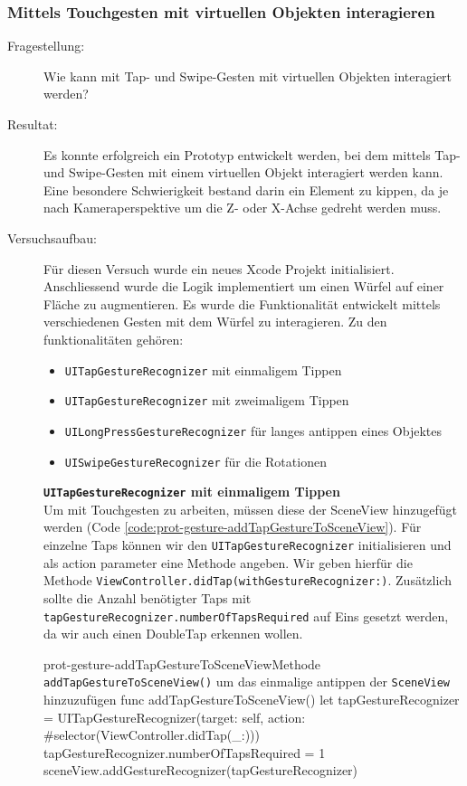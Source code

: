 \subsubsection{Mittels Touchgesten mit virtuellen Objekten interagieren}\label{subsub:prot-interagieren}
\begin{description}
	\item[Fragestellung:] Wie kann mit Tap- und Swipe-Gesten mit virtuellen Objekten interagiert werden?
	\item[Resultat:] Es konnte erfolgreich ein Prototyp entwickelt werden, bei dem mittels Tap- und Swipe-Gesten mit einem virtuellen Objekt interagiert werden kann. Eine besondere Schwierigkeit bestand darin ein Element zu kippen, da je nach Kameraperspektive um die Z- oder X-Achse gedreht werden muss. 
    \item[Versuchsaufbau:] Für diesen Versuch wurde ein neues Xcode Projekt initialisiert. Anschliessend wurde die Logik implementiert um einen Würfel auf einer Fläche zu augmentieren. Es wurde die Funktionalität entwickelt mittels verschiedenen Gesten mit dem Würfel zu interagieren. Zu den funktionalitäten gehören:
    

    \begin{itemize}
        \item \texttt{UITapGestureRecognizer} mit einmaligem Tippen
        \item \texttt{UITapGestureRecognizer} mit zweimaligem Tippen
        \item \texttt{UILongPressGestureRecognizer} für langes antippen eines Objektes
        \item \texttt{UISwipeGestureRecognizer} für die Rotationen
    \end{itemize}


    \textbf{\texttt{UITapGestureRecognizer} mit einmaligem Tippen}\\
    Um mit Touchgesten zu arbeiten, müssen diese der SceneView hinzugefügt werden (Code \ref{code:prot-gesture-addTapGestureToSceneView}). Für einzelne Taps können wir den \texttt{UITapGestureRecognizer} initialisieren und als action parameter eine Methode angeben. Wir geben hierfür die Methode \texttt{ViewController.didTap(withGestureRecognizer:)}. Zusätzlich sollte die Anzahl benötigter Taps mit \texttt{tapGestureRecognizer.numberOfTapsRequired} auf Eins gesetzt werden, da wir auch einen DoubleTap erkennen wollen. 
    \begin{code}{prot-gesture-addTapGestureToSceneView}{Methode \texttt{addTapGestureToSceneView()} um das einmalige antippen der \texttt{SceneView} hinzuzufügen}
    func addTapGestureToSceneView() {
        let tapGestureRecognizer = UITapGestureRecognizer(target: self, action: #selector(ViewController.didTap(\_:)))
        tapGestureRecognizer.numberOfTapsRequired = 1
        sceneView.addGestureRecognizer(tapGestureRecognizer)
    }
    \end{code}


\end{description}
